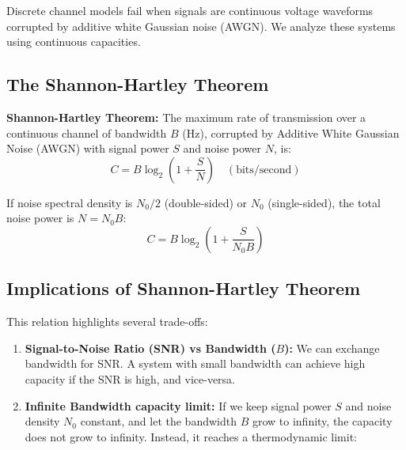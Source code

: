 \documentclass[12pt,a4paper]{article}
\begin{document}
Discrete channel models fail when signals are continuous voltage waveforms corrupted by additive white Gaussian noise (AWGN). We analyze these systems using continuous capacities.

\subsection{The Shannon-Hartley Theorem}
\begin{tcolorbox}[defbox]
\textbf{Shannon-Hartley Theorem:} The maximum rate of transmission over a continuous channel of bandwidth $B$ (Hz), corrupted by Additive White Gaussian Noise (AWGN) with signal power $S$ and noise power $N$, is:
\begin{equation}
  C = B \log_2 \left( 1 + \frac{S}{N} \right) \quad (\text{bits/second})
\end{equation}
\end{tcolorbox}
If noise spectral density is $N_0/2$ (double-sided) or $N_0$ (single-sided), the total noise power is $N = N_0 B$:
\begin{equation}
  C = B \log_2 \left( 1 + \frac{S}{N_0 B} \right)
\end{equation}

\subsection{Implications of Shannon-Hartley Theorem}
This relation highlights several trade-offs:
\begin{enumerate}[label=\textbf{\alph*.}, leftmargin=*, itemsep=3.5pt]
  \item \textbf{Signal-to-Noise Ratio (SNR) vs Bandwidth ($B$):} We can exchange bandwidth for SNR. A system with small bandwidth can achieve high capacity if the SNR is high, and vice-versa.
  \item \textbf{Infinite Bandwidth capacity limit:} If we keep signal power $S$ and noise density $N_0$ constant, and let the bandwidth $B$ grow to infinity, the capacity does not grow to infinity. Instead, it reaches a thermodynamic limit:
\end{enumerate}
\end{document}
